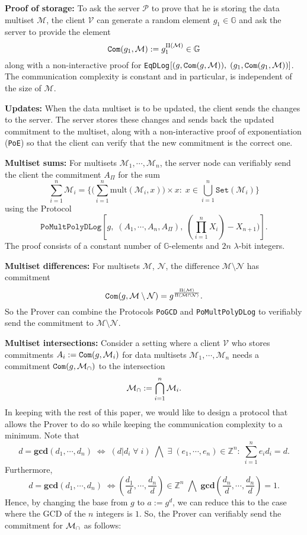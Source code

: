 \documentclass[11pt, lettersize, notitlepage, leqno, footskip=0.6cm]{article}
\newcommand{\bz}{\mathbb Z}
\newcommand{\pl}{\prod\limits}
\newcommand{\slim}{\sum\limits}
\newcommand{\ttt}{\texttt}
\newcommand{\sett}{\ttt{Set}}
\newcommand{\mul}{\mr{mult}}
\newcommand{\LRA}{\Longleftrightarrow}
\newcommand{\mc}{\mathcal}
\newcommand{\mb}{\mathbb}
\newcommand{\mbf}{\mathbf}
\newcommand{\mr}{\mathrm}
\newcommand{\sm}{\setminus}
\newcommand{\lam}{\lambda}
\newcommand{\mP}{\mc{P}}
\newcommand{\V}{\mc{V}}
\newcommand{\mcM}{\mc{M}}
\newcommand{\vs}{\vspace{-0.15cm}}
\newcommand{\noin}{\noindent}
\newcommand{\GCD}{\mbf{gcd}}
\numberwithin{equation}{section}
\begin{document}
\noin \textbf{Proof of storage:} To ask the server $\mP$ to prove that he is storing the data multiset $\mc{M}$, the client $\V$ can generate a random element $g_1\in\mb{G}$ and ask the server to provide the element \vs $$\protect{\verb|Com|}(g_1, \mc{M}):= g_1^{\Pi(\mc{M})}\in\mb{G}$$ along with a non-interactive proof for \verb|EqDLog|$[(g, \protect{\verb|Com|}(g, \mc{M})),\;(g_1, \protect{\verb|Com|}(g_1, \mc{M}))]$. The communication complexity is constant and in particular, is independent of the size of $\mc{M}$.\vspace{0.15cm}

\noin \textbf{Updates:} When the data multiset is to be updated, the client sends the changes to the server. The server stores these changes and sends back the updated commitment to the multiset, along with a non-interactive proof of exponentiation (\verb|PoE|) so that the client can verify that the new commitment is the correct one. \vspace{0.15cm}

\noin \textbf{Multiset sums:} For multisets $\mc{M}_1,\cdots,\mc{M}_n$, the server node can verifiably send the client the commitment $A_{\Pi}$ for the sum \vs $$\sum\limits_{i=1}^n \mc{M}_i = \Big\{\big(\sum\limits_{i=1}^n \mul(\mc{M}_i, x)\big)\times x:\; x\in\bigcup\limits_{i=1}^n \sett(\mc{M}_i)\Big\} $$ using the Protocol \vs $$\ttt{PoMultPolyDLog}[g,\; (A_1,\cdots,A_n,A_{\Pi}),\;(\pl_{i=1}^{n}X_i)-X_{n+1})].$$ The proof consists of a constant number of $\mb{G}$-elements and $2n$ $\lam$-bit integers.

\bigskip

\noin \textbf{Multiset differences:} For multisets $\mc{M}$, $\mc{N}$, the difference $\mc{M}\sm \mc{N} $ has commitment \vs $$\protect{\verb|Com|}(g, \mc{M}\sm \mc{N}) = g^{\frac{\Pi(\mcM)}{\Pi(\mcM\cap \mc{N})}} .$$ So the Prover can combine the Protocols \verb|PoGCD| and \verb|PoMultPolyDLog| to verifiably send the commitment to $\mc{M}\sm \mc{N} $. 

\bigskip

\noin \textbf{Multiset intersections:} Consider a setting where a client $\mc{V}$ who stores commitments $A_i:= \protect{\ttt{Com}}(g, \mc{M}_i)$ for data multisets $\mc{M}_1, \cdots, \mc{M}_n$ needs a commitment $\protect{\verb|Com|}(g, \mc{M}_{\tt{\cap}})$ to the intersection \vs $$\mc{M}_{\tt{\cap}}:=\bigcap\limits_{i=1}^n \mc{M}_i .$$ In keeping with the rest of this paper, we would like to design a protocol that allows the Prover to do so while keeping the communication complexity to a minimum. Note that \vs $$d = \GCD(d_1,\cdots,d_n)\; \LRA\; (d|d_i\;\forall\;i)\;\bigwedge\; \exists\;(e_1,\cdots,e_n)\in\bz^n:\;\slim_{i=1}^n e_id_i = d .$$\vs Furthermore, \vs $$d = \GCD(d_1,\cdots,d_n)\; \LRA \left(\frac{d_1}{d},\cdots, \frac{d_n}{d}\right)\in \bz^n\;\bigwedge\; \GCD\left(\frac{d_n}{d},\cdots, \frac{d_n}{d}\right)=1.$$ Hence, by changing the base from $g$ to $a:= g^d$, we can reduce this to the case where the GCD of the $n$ integers is $1$. So, the Prover can verifiably send the commitment for $\mc{M}_{\tt{\cap}}$ as follows:
\end{document}
